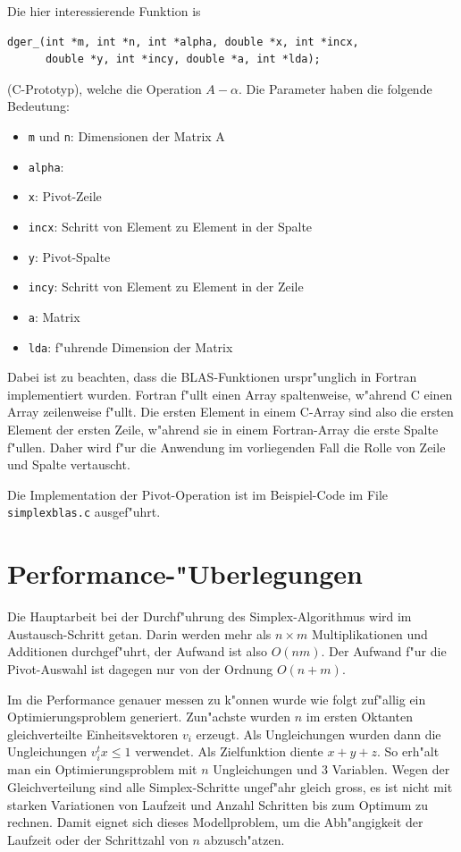 Die hier interessierende Funktion is
\begin{verbatim}
dger_(int *m, int *n, int *alpha, double *x, int *incx,
      double *y, int *incy, double *a, int *lda);
\end{verbatim}
(C-Prototyp), welche die Operation $A-\alpha $. Die Parameter haben die folgende Bedeutung:
\begin{itemize}
\item {\tt m} und {\tt n}: Dimensionen der Matrix A
\item {\tt alpha}: 
\item {\tt x}: Pivot-Zeile
\item {\tt incx}: Schritt von Element zu Element in der Spalte 
\item {\tt y}: Pivot-Spalte
\item {\tt incy}: Schritt von Element zu Element in der Zeile
\item {\tt a}: Matrix
\item {\tt lda}: f"uhrende Dimension der Matrix
\end{itemize}
Dabei ist zu beachten, dass die BLAS-Funktionen urspr"unglich in Fortran
implementiert wurden.
Fortran f"ullt einen Array spaltenweise, w"ahrend
C einen Array zeilenweise f"ullt.
Die ersten Element in einem C-Array sind also die ersten Element der
ersten Zeile, w"ahrend sie in einem Fortran-Array die erste Spalte
f"ullen. Daher wird f"ur die Anwendung im vorliegenden Fall die Rolle
von Zeile und Spalte vertauscht.

Die Implementation der Pivot-Operation ist im Beispiel-Code im
File {\tt simplexblas.c} ausgef"uhrt.

\section{Performance-"Uberlegungen}
Die Hauptarbeit bei der Durchf"uhrung des Simplex-Algorithmus wird im
Austausch-Schritt getan. Darin werden mehr als $n\times m$ Multiplikationen
und Additionen durchgef"uhrt, der Aufwand ist also $O(nm)$.
Der Aufwand f"ur die Pivot-Auswahl ist dagegen nur von der Ordnung
$O(n+m)$.

Im die Performance genauer messen zu k"onnen wurde wie folgt zuf"allig
ein Optimierungsproblem generiert. Zun"achste wurden $n$ im 
ersten Oktanten gleichverteilte Einheitsvektoren $v_i$ erzeugt.
Als Ungleichungen wurden dann die Ungleichungen $v_i^t x\le 1$ 
verwendet. Als Zielfunktion diente $x+y+z$. So erh"alt man
ein Optimierungsproblem mit $n$ Ungleichungen und $3$ Variablen.
Wegen der Gleichverteilung sind alle Simplex-Schritte ungef"ahr gleich
gross, es ist nicht mit starken Variationen von Laufzeit und
Anzahl Schritten bis zum Optimum zu rechnen. Damit eignet sich
dieses Modellproblem, um die Abh"angigkeit der Laufzeit oder
der Schrittzahl von $n$ abzusch"atzen.

